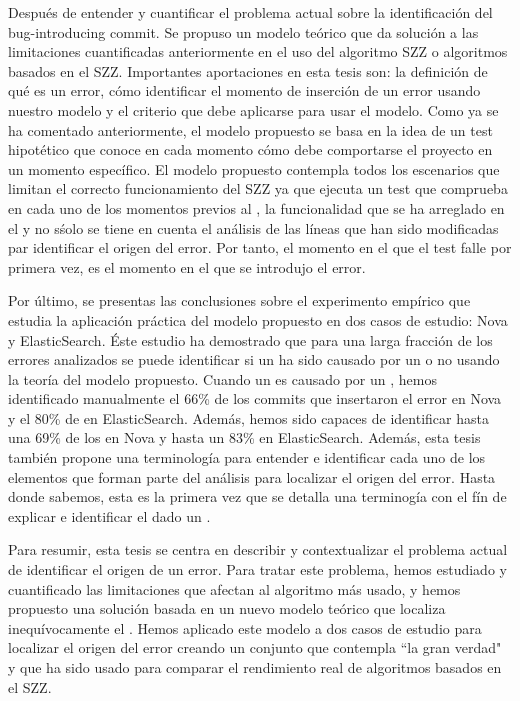 \documentclass[a4paper, 12pt]{book}
\begin{document}
Despu\'es de entender y cuantificar el problema actual sobre la identificaci\'on del bug-introducing commit. Se propuso un modelo te\'orico que da soluci\'on a las limitaciones cuantificadas anteriormente en el uso del algoritmo SZZ o algoritmos basados en el SZZ. Importantes aportaciones en esta tesis son: la definici\'on de qu\'e es un error, c\'omo identificar el momento de inserci\'on de un error usando nuestro modelo y el criterio que debe aplicarse para usar el modelo. Como ya se ha comentado anteriormente, el modelo propuesto se basa en la idea de un test hipot\'etico que conoce en cada momento c\'omo debe comportarse el proyecto en un momento espec\'ifico. El modelo propuesto contempla todos los escenarios que limitan el correcto funcionamiento del SZZ ya que ejecuta un test que comprueba en cada uno de los momentos previos al \BFC, la funcionalidad que se ha arreglado en el \BFC y no s\'solo se tiene en cuenta el an\'alisis de las l\'ineas que han sido modificadas par identificar el origen del error. Por tanto, el momento en el que el test falle por primera vez, es el momento en el que se introdujo el error.

Por \'ultimo, se presentas las conclusiones sobre el experimento emp\'irico que estudia la aplicaci\'on pr\'actica del modelo propuesto en dos casos de estudio: Nova y ElasticSearch. \'Este estudio ha demostrado que para una larga fracci\'on de los errores analizados se puede identificar si un \BFC ha sido causado por un \BIC o no usando la teor\'ia del modelo propuesto. Cuando un \BFC es causado por un \BIC, hemos identificado manualmente el 66\% de los commits que insertaron el error en Nova y el 80\% de en ElasticSearch. Adem\'as, hemos sido capaces de identificar hasta una 69\% de los \FFC en Nova y hasta un 83\% en ElasticSearch. Adem\'as, esta tesis tambi\'en propone una terminolog\'ia para entender e identificar cada uno de los elementos que forman parte del an\'alisis para localizar el origen del error. Hasta donde sabemos, esta es la primera vez que se detalla una terminog\'ia con el f\'in de explicar e identificar el \BIC dado un \BFC.


Para resumir, esta tesis se centra en describir y contextualizar el problema actual de identificar el origen de un error. Para tratar este problema, hemos estudiado y cuantificado las limitaciones que afectan al algoritmo m\'as usado, y hemos propuesto una soluci\'on basada en un nuevo modelo te\'orico que localiza inequ\'ivocamente el \BIC. Hemos aplicado este modelo a dos casos de estudio para localizar el origen del error creando un conjunto que contempla ``la gran verdad" y que ha sido usado para comparar el rendimiento real de algoritmos basados en el SZZ.
\end{document}
